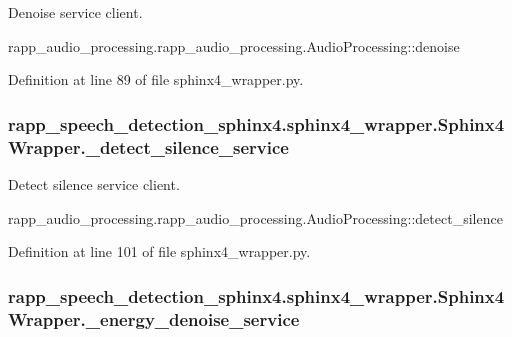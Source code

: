 Denoise service client. 

rapp\-\_\-audio\-\_\-processing.\-rapp\-\_\-audio\-\_\-processing.\-Audio\-Processing\-::denoise 

Definition at line 89 of file sphinx4\-\_\-wrapper.\-py.

\hypertarget{classrapp__speech__detection__sphinx4_1_1sphinx4__wrapper_1_1Sphinx4Wrapper_a59c868f2dda79206d0a53650d93f6f8b}{
\subsubsection[{\-\_\-detect\-\_\-silence\-\_\-service}]{\setlength{\rightskip}{0pt plus 5cm}rapp\-\_\-speech\-\_\-detection\-\_\-sphinx4.\-sphinx4\-\_\-wrapper.\-Sphinx4\-Wrapper.\-\_\-detect\-\_\-silence\-\_\-service\hspace{0.3cm}{\ttfamily [private]}}}\label{classrapp__speech__detection__sphinx4_1_1sphinx4__wrapper_1_1Sphinx4Wrapper_a59c868f2dda79206d0a53650d93f6f8b}


Detect silence service client. 

rapp\-\_\-audio\-\_\-processing.\-rapp\-\_\-audio\-\_\-processing.\-Audio\-Processing\-::detect\-\_\-silence 

Definition at line 101 of file sphinx4\-\_\-wrapper.\-py.

\hypertarget{classrapp__speech__detection__sphinx4_1_1sphinx4__wrapper_1_1Sphinx4Wrapper_a72b86a6db9d93651c9202cb5cbf67c4b}{
\subsubsection[{\-\_\-energy\-\_\-denoise\-\_\-service}]{\setlength{\rightskip}{0pt plus 5cm}rapp\-\_\-speech\-\_\-detection\-\_\-sphinx4.\-sphinx4\-\_\-wrapper.\-Sphinx4\-Wrapper.\-\_\-energy\-\_\-denoise\-\_\-service\hspace{0.3cm}{\ttfamily [private]}}}\label{classrapp__speech__detection__sphinx4_1_1sphinx4__wrapper_1_1Sphinx4Wrapper_a72b86a6db9d93651c9202cb5cbf67c4b}


